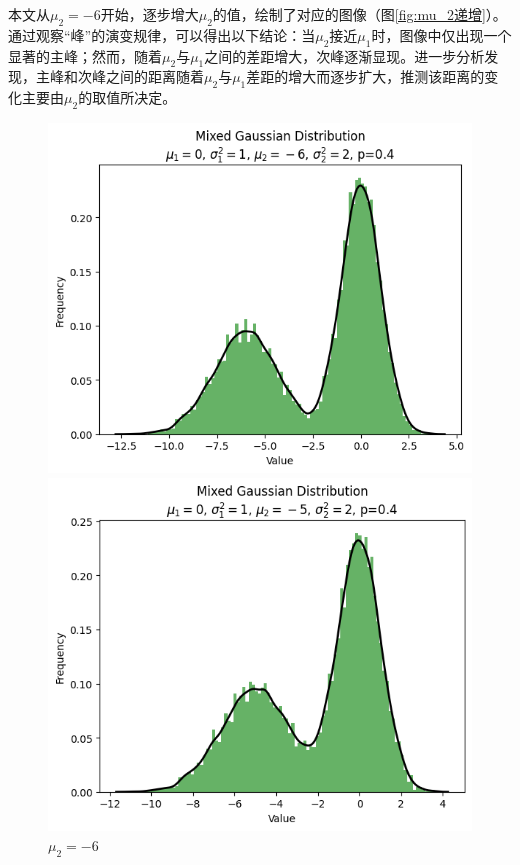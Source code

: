 \documentclass{article}
\begin{document}
本文从$\mu_2 = -6$开始，逐步增大$\mu_2$的值，绘制了对应的图像（图\ref{fig:mu_2递增}）。通过观察“峰”的演变规律，可以得出以下结论：当$\mu_2$接近$\mu_1$时，图像中仅出现一个显著的主峰；然而，随着$\mu_2$与$\mu_1$之间的差距增大，次峰逐渐显现。进一步分析发现，主峰和次峰之间的距离随着$\mu_2$与$\mu_1$差距的增大而逐步扩大，推测该距离的变化主要由$\mu_2$的取值所决定。\label{sec:peak_dist}

\begin{figure}[H]
    \centering
    \begin{minipage}[b]{0.2\linewidth}
        \centering
        \includegraphics[width=\linewidth]{figure/mu_2=-6.png}
        \caption{$\mu_2=-6$}
    \end{minipage}
    \hfill
    \begin{minipage}[b]{0.2\linewidth}
        \centering
        \includegraphics[width=\linewidth]{figure/mu_2=-5.png}

\end{minipage}
\end{figure}
\end{document}
